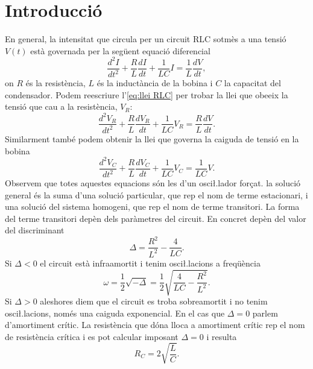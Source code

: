 \section{Introducció}
En general, la intensitat que circula per un circuit RLC sotmès a una tensió \( V(t) \) està governada per la següent equació diferencial
\begin{equation} \label{eq:llei RLC}
	\frac{d^2 I}{dt^2} + \frac{R}{L} \frac{dI}{dt} + \frac{1}{LC}I = \frac{1}{L}\frac{dV}{dt},
\end{equation}
on \( R \) és la resistència, \( L \) és la inductància de la bobina i \( C \) la capacitat del condensador. Podem reescriure l'\cref{eq:llei RLC} per trobar la llei que obeeix la tensió que cau a la resistència, \( V_R \):
\begin{equation} \label{eq:llei VR}
	\frac{d^2V_R}{dt^2} + \frac{R}{L}\frac{dV_R}{dt} + \frac{1}{LC}V_R = \frac{R}{L}\frac{dV}{dt}.
\end{equation}
Similarment també podem obtenir la llei que governa la caiguda de tensió en la bobina
\begin{equation} \label{eq:llei VC}
	\frac{d^2V_C}{dt^2} + \frac{R}{L}\frac{dV_C}{dt} + \frac{1}{LC}V_C = \frac{1}{LC}V.
\end{equation}
Observem que totes aquestes equacions són les d'un osci\l.lador forçat. la solució general és la suma d'una solució particular, que rep el nom de terme estacionari, i una solució del sistema homogeni, que rep el nom de terme transitori. La forma del terme transitori depèn dels paràmetres del circuit. En concret depèn del valor del discriminant
\begin{equation*}
	\Delta = \frac{R^2}{L^2} - \frac{4}{LC}.
\end{equation*}
Si \( \Delta < 0 \) el circuit està infraamortit i tenim osci\l.lacions a freqüència 
\begin{equation} \label{eq:freq amortida}
 	\omega = \frac{1}{2}\sqrt{-\Delta} = \frac{1}{2}\sqrt{\frac{4}{LC} - \frac{R^2}{L^2}}. 
\end{equation}
Si \( \Delta > 0 \) aleshores diem que el circuit es troba sobreamortit i no tenim osci\l.lacions, només una caiguda exponencial. En el cas que \( \Delta = 0 \) parlem d'amortiment crític. La resistència que dóna lloca a amortiment crític rep el nom de resistència crítica i es pot calcular imposant \( \Delta = 0 \) i resulta
\begin{equation} \label{eq:resistencia critica}
	R_C = 2\sqrt{\frac{L}{C}}. 
\end{equation}

